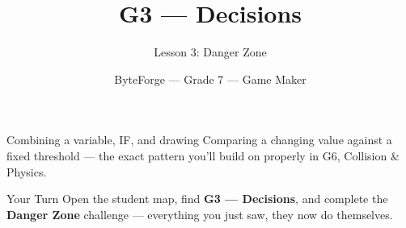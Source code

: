 \documentclass[aspectratio=169]{beamer}
\title{G3 — Decisions}
\subtitle{Lesson 3: Danger Zone}
\author{ByteForge --- Grade 7 --- Game Maker}
\date{}
\begin{document}
\begin{frame}
    \titlepage
\end{frame}

\begin{frame}{Combining a variable, IF, and drawing}
    \Large
    Comparing a changing value against a fixed threshold — the exact pattern you'll build on properly in G6, Collision \& Physics.
\end{frame}

\begin{frame}{Your Turn}
    \Large
    Open the student map, find \textbf{G3 — Decisions}, and complete
    the \textbf{Danger Zone} challenge --- everything you just saw, they now do themselves.
\end{frame}
\end{document}
